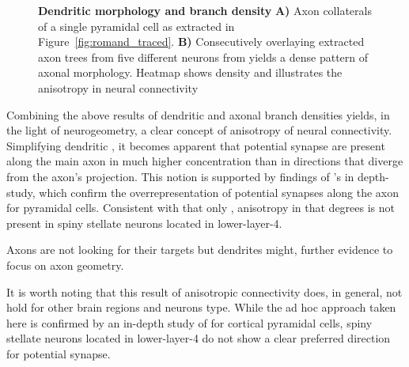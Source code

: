 \begin{figure}[!ht]
  \vspace{0.3cm}
  \caption{\textbf{Dendritic morphology and branch density} \textbf{A)} Axon
      collaterals of a single pyramidal cell as extracted in
      Figure~\ref{fig:romand_traced}. \textbf{B)} Consecutively
      overlaying extracted axon trees from five different neurons from
      \textcite{Romand2011} yields a dense pattern of axonal
      morphology. Heatmap shows density and illustrates the anisotropy
      in neural connectivity}%
  \label{fig:dendrite_heat}
\end{figure}
\vspace{-0.2cm}

Combining the above results of dendritic and axonal branch densities
yields, in the light of neurogeometry, a clear concept of anisotropy
of neural connectivity. Simplifying dendritic , it becomes apparent
that potential synapse are present along the main axon in much higher
concentration than in directions that diverge from the axon's
projection. This notion is supported by findings of
\textcite{Stepanyants2005}'s in depth-study, which confirm the
overrepresentation of potential synapses along the axon for pyramidal
cells. Consistent with that only , anisotropy in that degrees is not
present in spiny stellate neurons located in lower-layer-4.


\cite{Thomson2002} Axons are not looking for their targets but
dendrites might, further evidence to focus on axon geometry.

It is worth noting that this result of anisotropic connectivity does,
in general, not hold for other brain regions and neurons type. While
the ad hoc approach taken here is confirmed by an in-depth study of
\textcite{Stepanyants2005} for cortical pyramidal cells, spiny
stellate neurons located in lower-layer-4 do not show a clear
preferred direction for potential synapse.


